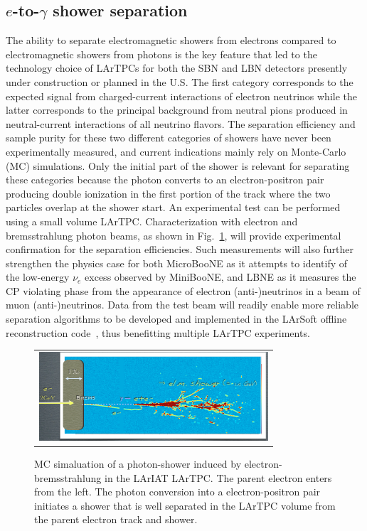 \documentclass[DIV=calc, paper=a4, fontsize=10pt, twocolumn]{scrartcl}	 %
\begin{document}
{\subsection{ $e$-to-$\gamma$ shower separation}
\label{e-gamma}
The ability to separate electromagnetic showers from electrons compared to electromagnetic showers from photons is the key feature that led to the technology choice of LArTPCs for both the SBN and LBN detectors presently under construction or planned in the U.S.  The first category corresponds to the expected signal from charged-current interactions of electron neutrinos while the latter corresponds to the principal background from neutral pions produced in neutral-current interactions of all neutrino flavors.  The separation efficiency and sample purity for these two different categories of showers have never been experimentally measured, and current indications mainly rely on Monte-Carlo (MC) simulations. Only the initial part of the shower is relevant for separating these categories because the photon converts to an electron-positron pair producing double ionization in the first portion of the track where the two particles overlap at the shower start.  An experimental test can be performed using a small volume LArTPC.  Characterization with electron and bremsstrahlung photon beams, as shown in  Fig.~\ref{fig:e-gamma-sep}, will provide experimental confirmation for the separation efficiencies.  Such measurements will also further strengthen the physics case for both MicroBooNE as it attempts to identify of the low-energy $\nu_e$ excess observed by MiniBooNE,  and LBNE  as it measures the CP violating phase from the appearance of electron (anti-)neutrinos in a beam of muon (anti-)neutrinos.  Data from the test beam will readily enable more reliable separation algorithms to be developed and implemented in the LArSoft offline reconstruction code~\cite{larsoft}, thus benefitting multiple LArTPC experiments.
\begin{figure}[!h]
\begin{centering}
\begin{tabular}{c}
\includegraphics[height=1.3in]{Figures/elm_shwr}
\end{tabular}
\caption{
{\scriptsize \sf MC simaluation of a photon-shower induced by electron-bremsstrahlung in the LArIAT LArTPC.  The parent electron enters from the left. The photon conversion into a electron-positron pair initiates a shower that is well separated in the LArTPC volume from the parent electron track and shower.}
}
\label{fig:e-gamma-sep}
\end{centering}
\end{figure}
 
}
\end{document}
